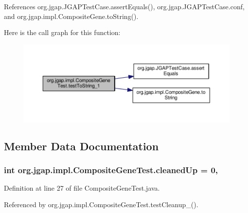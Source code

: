 References org.\-jgap.\-J\-G\-A\-P\-Test\-Case.\-assert\-Equals(), org.\-jgap.\-J\-G\-A\-P\-Test\-Case.\-conf, and org.\-jgap.\-impl.\-Composite\-Gene.\-to\-String().



Here is the call graph for this function\-:
\nopagebreak
\begin{figure}[H]
\begin{center}
\leavevmode
\includegraphics[width=350pt]{classorg_1_1jgap_1_1impl_1_1_composite_gene_test_aa1d241338660b17f3e24c8630d6ea5b7_cgraph}
\end{center}
\end{figure}




\subsection{Member Data Documentation}
\hypertarget{classorg_1_1jgap_1_1impl_1_1_composite_gene_test_a0cd6b81e91fa16b4450b386ed86aa3c0}{
\subsubsection[{cleaned\-Up}]{\setlength{\rightskip}{0pt plus 5cm}int org.\-jgap.\-impl.\-Composite\-Gene\-Test.\-cleaned\-Up = 0\hspace{0.3cm}{\ttfamily [static]}, {\ttfamily [private]}}}\label{classorg_1_1jgap_1_1impl_1_1_composite_gene_test_a0cd6b81e91fa16b4450b386ed86aa3c0}


Definition at line 27 of file Composite\-Gene\-Test.\-java.



Referenced by org.\-jgap.\-impl.\-Composite\-Gene\-Test.\-test\-Cleanup\-\_().

